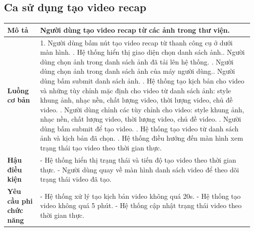 \subsection{Ca sử dụng tạo video recap}

\vspace{0.5cm}

\noindent 
\begin{tabularx}{\linewidth}{| l | X |} 
\hline 
\textbf{Mô tả} & Người dùng tạo video recap từ các ảnh trong thư viện. \\
\hline 
\textbf{Luồng cơ bản} & 1. Người dùng bấm nút tạo video recap từ thanh công cụ ở dưới màn hình. \newline
                       2. Hệ thống hiển thị giao diện chọn danh sách ảnh.\newline
                       3. Người dùng chọn ảnh trong danh sách ảnh đã tải lên hệ thống. \newline
                       4. Người dùng chọn ảnh trong danh sách ảnh của máy người dùng.\newline
                       5. Người dùng bấm submit danh sách ảnh. \newline
                       6. Hệ thống tạo kịch bản cho video và những tùy chỉnh mặc định cho video từ danh sách ảnh: style khung ảnh, nhạc nền, chất lượng video, thời lượng video, chủ đề video. \newline
                       7. Người dùng chỉnh các tùy chỉnh cho video: style khung ảnh, nhạc nền, chất lượng video, thời lượng video, chủ đề video. \newline
                       8. Người dùng bấm submit để tạo video. \newline
                       9. Hệ thống tạo video từ danh sách ảnh và kịch bản đã chọn. \newline
                       10. Hệ thống điều hướng đến màn hình xem trạng thái tạo video theo thời gian thực. \\
\hline 
\textbf{Hậu điều kiện} & - Hệ thống hiển thị trạng thái và tiến độ tạo video theo thời gian thực. \newline
                         - Người dùng quay về màn hình danh sách video để theo dõi trạng thái video đã tạo. \\
\hline 
\textbf{Yêu cầu phi chức năng} & - Hệ thống xử lý tạo kịch bản video không quá 20s. \newline 
                                 - Hệ thống tạo video không quá 5 phút. \newline
                                 - Hệ thống cập nhật trạng thái video theo thời gian thực. \\
\hline 
\end{tabularx}

